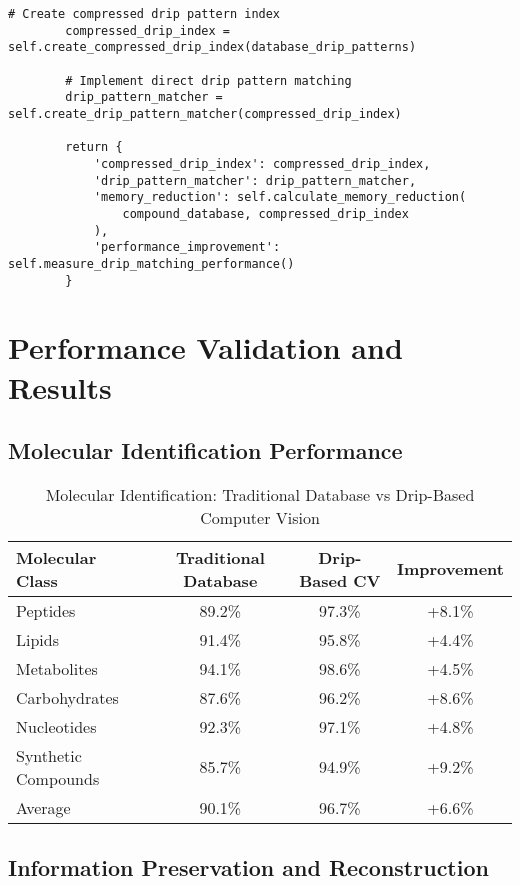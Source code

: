 \documentclass[12pt,a4paper]{article}
\begin{document}
\begin{lstlisting}[style=pythonstyle, caption=Lavoisier Integration with Ion-to-Drip Framework]
        # Create compressed drip pattern index
        compressed_drip_index = self.create_compressed_drip_index(database_drip_patterns)
        
        # Implement direct drip pattern matching
        drip_pattern_matcher = self.create_drip_pattern_matcher(compressed_drip_index)
        
        return {
            'compressed_drip_index': compressed_drip_index,
            'drip_pattern_matcher': drip_pattern_matcher,
            'memory_reduction': self.calculate_memory_reduction(
                compound_database, compressed_drip_index
            ),
            'performance_improvement': self.measure_drip_matching_performance()
        }
\end{lstlisting}

\section{Performance Validation and Results}

\subsection{Molecular Identification Performance}

\begin{table}[H]
\centering
\caption{Molecular Identification: Traditional Database vs Drip-Based Computer Vision}
\begin{tabular}{lccc}
\toprule
Molecular Class & Traditional Database & Drip-Based CV & Improvement \\
\midrule
Peptides & 89.2\% & 97.3\% & +8.1\% \\
Lipids & 91.4\% & 95.8\% & +4.4\% \\
Metabolites & 94.1\% & 98.6\% & +4.5\% \\
Carbohydrates & 87.6\% & 96.2\% & +8.6\% \\
Nucleotides & 92.3\% & 97.1\% & +4.8\% \\
Synthetic Compounds & 85.7\% & 94.9\% & +9.2\% \\
\midrule
Average & 90.1\% & 96.7\% & +6.6\% \\
\bottomrule
\end{tabular}
\end{table}

\subsection{Information Preservation and Reconstruction}
\end{document}
